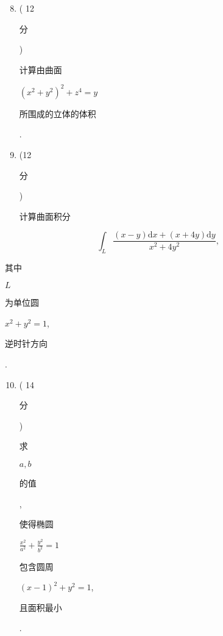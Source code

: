 \documentclass[10pt]{article}
\begin{document}
\begin{enumerate}
  \setcounter{enumi}{7}
  \item ( 12 \begin{CJK}{UTF8}{mj}分\end{CJK}) \begin{CJK}{UTF8}{mj}计算由曲面\end{CJK} $\left(x^{2}+y^{2}\right)^{2}+z^{4}=y$ \begin{CJK}{UTF8}{mj}所围成的立体的体积\end{CJK}.

  \item (12 \begin{CJK}{UTF8}{mj}分\end{CJK}) \begin{CJK}{UTF8}{mj}计算曲面积分\end{CJK}

\end{enumerate}
$$
\int_{L} \frac{(x-y) \mathrm{d} x+(x+4 y) \mathrm{d} y}{x^{2}+4 y^{2}},
$$
\begin{CJK}{UTF8}{mj}其中\end{CJK} $L$ \begin{CJK}{UTF8}{mj}为单位圆\end{CJK} $x^{2}+y^{2}=1$, \begin{CJK}{UTF8}{mj}逆时针方向\end{CJK}.

\begin{enumerate}
  \setcounter{enumi}{9}
  \item ( 14 \begin{CJK}{UTF8}{mj}分\end{CJK}) \begin{CJK}{UTF8}{mj}求\end{CJK} $a, b$ \begin{CJK}{UTF8}{mj}的值\end{CJK}, \begin{CJK}{UTF8}{mj}使得椭圆\end{CJK} $\frac{x^{2}}{a^{2}}+\frac{y^{2}}{b^{2}}=1$ \begin{CJK}{UTF8}{mj}包含圆周\end{CJK} $(x-1)^{2}+y^{2}=1$, \begin{CJK}{UTF8}{mj}且面积最小\end{CJK}.
\end{enumerate}
\end{document}
